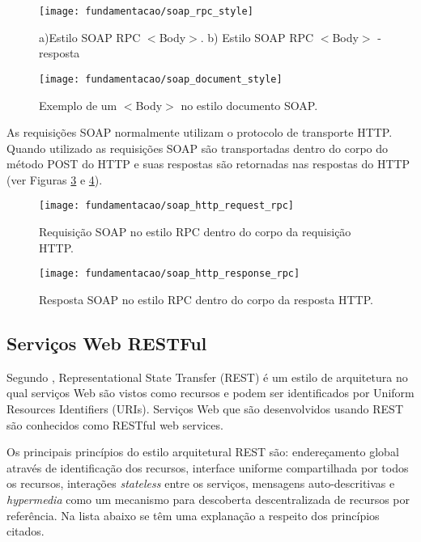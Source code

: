 \begin{figure}[!htb] \centering
  \centering
  \texttt{[image: fundamentacao/soap\_rpc\_style]} 
  \caption{a)Estilo SOAP RPC $<$Body$>$. b) Estilo SOAP RPC $<$Body$>$ - resposta\cite{Papazoglou:2008}} 
  \label{fig:wssoap_msg_soap_rpc}
\end{figure}

\begin{figure}[!htb] \centering
  \centering
  \texttt{[image: fundamentacao/soap\_document\_style]} 
  \caption{Exemplo de um $<$Body$>$ no estilo documento SOAP.\cite{Papazoglou:2008}} 
  \label{fig:wssoap_msg_soap_document}
\end{figure}

As requisições SOAP normalmente utilizam o protocolo de transporte HTTP. Quando utilizado as requisições SOAP são transportadas dentro do corpo do método POST do HTTP e suas respostas são retornadas nas respostas do HTTP (ver Figuras \ref{fig:wssoap_soap_http_request_rpc} e \ref{fig:wssoap_soap_http_response_rpc}).

\begin{figure}[!htb] \centering
  \centering
  \texttt{[image: fundamentacao/soap\_http\_request\_rpc]} 
  \caption{Requisição SOAP no estilo RPC dentro do corpo da requisição HTTP.\cite{Papazoglou:2008}} 
  \label{fig:wssoap_soap_http_request_rpc}
\end{figure}

\begin{figure}[!htb] \centering
  \centering
  \texttt{[image: fundamentacao/soap\_http\_response\_rpc]} 
  \caption{Resposta SOAP no estilo RPC dentro do corpo da resposta HTTP.\cite{Papazoglou:2008}} 
  \label{fig:wssoap_soap_http_response_rpc}
\end{figure}

\subsection{Serviços Web RESTFul}
\label{subsec:restful}
Segundo \cite{Heffelfinger:2014}, Representational State Transfer (REST) é um estilo de arquitetura no qual serviços Web são vistos como recursos e podem ser identificados por Uniform Resources Identifiers (URIs). Serviços Web que são desenvolvidos usando REST são conhecidos como RESTful web services. 

Os principais princípios do estilo arquitetural REST são: endereçamento global através de identificação dos recursos, interface uniforme compartilhada por todos os recursos, interações \textit{stateless} entre os serviços, mensagens auto-descritivas e \textit{hypermedia} como um mecanismo para descoberta descentralizada de recursos por referência\cite{Pautasso:2014}. Na lista abaixo se têm uma explanação a respeito dos princípios citados.

